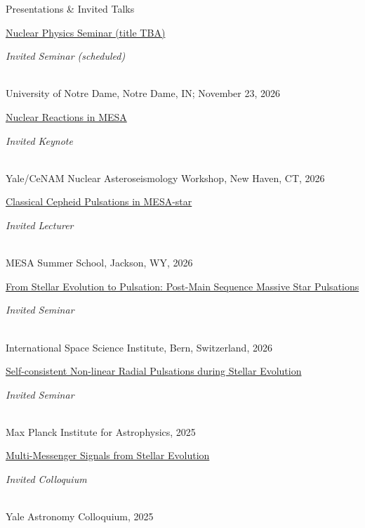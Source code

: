 \begin{rSection}{Presentations \& Invited Talks}
\begin{revnumerate}

\item \parbox[t]{0.74\linewidth}{\href{https://physics.nd.edu/news-events/events/2026/11/23/nuclear-physics-seminar-dr-ebraheem-farag-yale-university/}{Nuclear Physics Seminar (title TBA)}}\hfill \parbox[t]{0.24\linewidth}{\raggedleft\em Invited Seminar (scheduled)}
\\ University of Notre Dame, Notre Dame, IN; November 23, 2026

\item \parbox[t]{0.74\linewidth}{\href{https://www.astro.yale.edu/bellinger/meetings/2026/cenam/}{Nuclear Reactions in MESA}}\hfill \parbox[t]{0.24\linewidth}{\raggedleft\em Invited Keynote}
\\ Yale/CeNAM Nuclear Asteroseismology Workshop, New Haven, CT, 2026

\item \parbox[t]{0.74\linewidth}{\href{https://mesastar.org/summer-school-2026/agenda/}{Classical Cepheid Pulsations in MESA-star}}\hfill \parbox[t]{0.24\linewidth}{\raggedleft\em Invited Lecturer}
\\ MESA Summer School, Jackson, WY, 2026

\item \parbox[t]{0.74\linewidth}{\href{https://www.issibern.ch/}{From Stellar Evolution to Pulsation: Post-Main Sequence Massive Star Pulsations}}\hfill \parbox[t]{0.24\linewidth}{\raggedleft\em Invited Seminar}
\\ International Space Science Institute, Bern, Switzerland, 2026

\item \parbox[t]{0.74\linewidth}{\href{https://wwwmpa.mpa-garching.mpg.de/SESTAS/doku.php?id=start}{Self-consistent Non-linear Radial Pulsations during Stellar Evolution}}\hfill \parbox[t]{0.24\linewidth}{\raggedleft\em Invited Seminar}
\\ Max Planck Institute for Astrophysics, 2025

\item \parbox[t]{0.74\linewidth}{\href{https://astronomy.yale.edu/event/yale-astronomy-colloquium-ebraheem-farag}{Multi-Messenger Signals from Stellar Evolution}}\hfill \parbox[t]{0.24\linewidth}{\raggedleft\em Invited Colloquium}
\\ Yale Astronomy Colloquium, 2025


\end{revnumerate}
\end{rSection}
